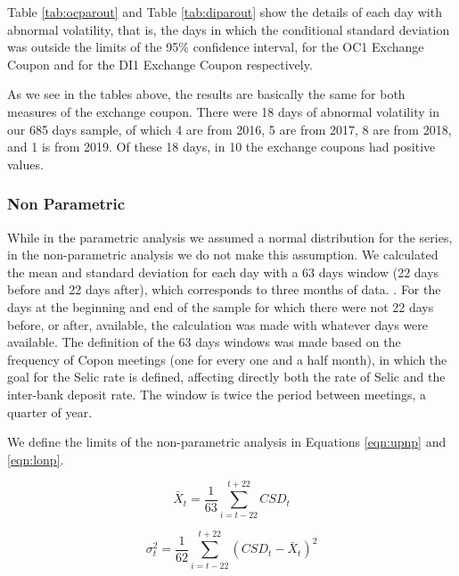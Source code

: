 \documentclass[a4paper]{article}
\begin{document}




Table \ref{tab:ocparout} and Table \ref{tab:diparout} show the details of each day with abnormal volatility, that is, the days in which the conditional standard deviation was outside the limits of the 95\% confidence interval, for the OC1 Exchange Coupon and for the DI1 Exchange Coupon respectively.






As we see in the tables above, the results are basically the same for both measures of the exchange coupon. There were 18 days of abnormal volatility in our 685 days sample, of which 4 are from 2016, 5 are from 2017, 8 are from 2018, and 1 is from 2019. Of these 18 days, in 10 the exchange coupons had positive values.

\subsubsection{Non Parametric}

While in the parametric analysis we assumed a normal distribution for the series, in the non-parametric analysis we do not make this assumption. We calculated the mean and standard deviation for each day with a 63 days window (22 days before and 22 days after), which corresponds to three months of data. . For the days at the beginning and end of the sample for which there were not 22 days before, or after, available, the calculation was made with whatever days were available. The definition of the 63 days windows was made based on the frequency of Copon meetings (one for every one and a half month), in which the goal for the Selic rate is defined, affecting directly both the rate of Selic and the inter-bank deposit rate. The window is twice the period between meetings, a quarter of year.

We define the limits of the non-parametric analysis in Equations \ref{eqn:upnp} and \ref{eqn:lonp}.

$$\bar{X}_t = \frac{1}{63} \displaystyle\sum_{i=t-22}^{t+22} CSD_t$$

$$\sigma^2_t = \frac{1}{62} \displaystyle\sum_{i=t-22}^{t+22} (CSD_t - \bar{X}_t)^2$$
\end{document}
